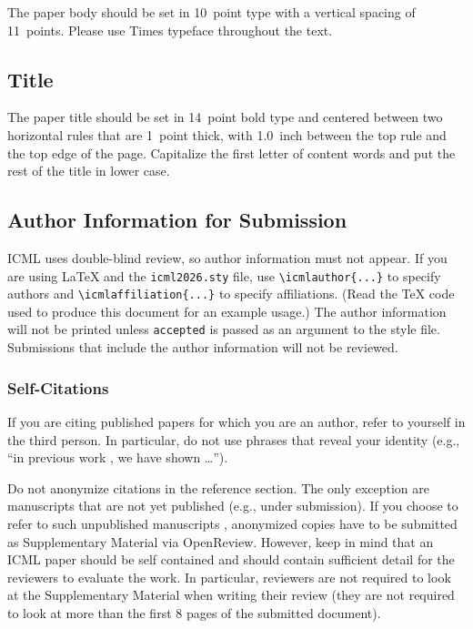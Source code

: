 \documentclass{article}
\theoremstyle{plain}
\theoremstyle{definition}
\theoremstyle{remark}
\begin{document}
The paper body should be set in 10~point type with a vertical spacing
of 11~points. Please use Times typeface throughout the text.

\subsection{Title}

The paper title should be set in 14~point bold type and centered
between two horizontal rules that are 1~point thick, with 1.0~inch
between the top rule and the top edge of the page. Capitalize the
first letter of content words and put the rest of the title in lower
case.

\subsection{Author Information for Submission}
\label{author info}

ICML uses double-blind review, so author information must not appear. If
you are using \LaTeX\/ and the \texttt{icml2026.sty} file, use
\verb+\icmlauthor{...}+ to specify authors and \verb+\icmlaffiliation{...}+
to specify affiliations. (Read the TeX code used to produce this document for
an example usage.) The author information will not be printed unless
\texttt{accepted} is passed as an argument to the style file. Submissions that
include the author information will not be reviewed.

\subsubsection{Self-Citations}

If you are citing published papers for which you are an author, refer
to yourself in the third person. In particular, do not use phrases
that reveal your identity (e.g., ``in previous work \cite{langley00}, we
have shown \ldots'').

Do not anonymize citations in the reference section. The only exception are manuscripts that are
not yet published (e.g., under submission). If you choose to refer to
such unpublished manuscripts \cite{anonymous}, anonymized copies have
to be submitted
as Supplementary Material via OpenReview\@. However, keep in mind that an ICML
paper should be self contained and should contain sufficient detail
for the reviewers to evaluate the work. In particular, reviewers are
not required to look at the Supplementary Material when writing their
review (they are not required to look at more than the first $8$ pages of the submitted document).
\end{document}
